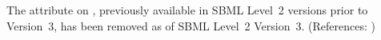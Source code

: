 The  attribute on \Species, previously available in
SBML Level~2 versions prior to Version~3, has been removed as of SBML
Level~2 Version~3.  (References: )

